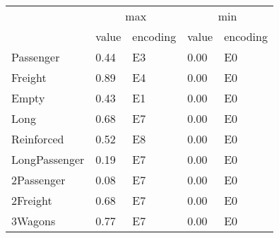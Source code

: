 \begin{tabular}{lllll}
\toprule
 & \multicolumn{2}{c}{max} & \multicolumn{2}{c}{min} \\
 & value & encoding & value & encoding \\
\midrule
Passenger & 0.44 & E3 & 0.00 & E0 \\
Freight & 0.89 & E4 & 0.00 & E0 \\
Empty & 0.43 & E1 & 0.00 & E0 \\
Long & 0.68 & E7 & 0.00 & E0 \\
Reinforced & 0.52 & E8 & 0.00 & E0 \\
LongPassenger & 0.19 & E7 & 0.00 & E0 \\
2Passenger & 0.08 & E7 & 0.00 & E0 \\
2Freight & 0.68 & E7 & 0.00 & E0 \\
3Wagons & 0.77 & E7 & 0.00 & E0 \\
\bottomrule
\end{tabular}

